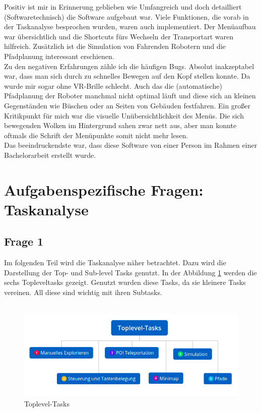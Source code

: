 \documentclass{TUBAFarbeiten}
\begin{document}
Positiv ist mir in Erinnerung geblieben wie Umfangreich und doch detailliert (Softwaretechnisch) die Software aufgebaut war. Viele Funktionen, die vorab in der Taskanalyse besprochen wurden, waren auch implementiert. Der Menüaufbau war übersichtlich und die Shortcuts fürs Wechseln der Transportart waren hilfreich. Zusätzlich ist die Simulation von Fahrenden Robotern und die Pfadplanung interessant erschienen. \\
Zu den negativen Erfahrungen zähle ich die häufigen Bugs. Absolut inakzeptabel war, dass man sich durch zu schnelles Bewegen auf den Kopf stellen konnte. Da wurde mir sogar ohne VR-Brille schlecht. Auch das die (automatische) Pfadplanung der Roboter manchmal nicht optimal läuft und diese sich an kleinen Gegenständen wie Büschen oder an Seiten von Gebäuden festfahren. Ein großer Kritikpunkt für mich war die visuelle Unübersichtlichkeit des Menüs. Die sich bewegenden Wolken im Hintergrund sahen zwar nett aus, aber man konnte oftmals die Schrift der Menüpunkte somit nicht mehr lesen.\\
Das beeindruckendste war, dass diese Software von einer Person im Rahmen einer Bachelorarbeit erstellt wurde.  
 


\newpage
\section{Aufgabenspezifische Fragen: Taskanalyse}
\subsection{Frage 1}
Im folgenden Teil wird die Taskanalyse näher betrachtet. Dazu wird die Darstellung der Top- und Sub-level Tasks genutzt. In der Abbildung \ref{fig:toplevel} werden die sechs Topleveltasks gezeigt. Genutzt wurden diese Tasks, da sie kleinere Tasks vereinen. All diese sind wichtig mit ihren Subtasks.\\\\

\begin{figure}
	\centering
	\includegraphics[width=\linewidth]{topleveltask.png}
	\caption{Toplevel-Tasks}
	\label{fig:toplevel}
\end{figure}
\end{document}

